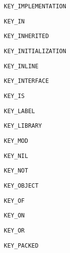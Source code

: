 \documentclass{report}
\begin{document}
\begin{list}{}
\begin{description}
\item[\texttt{KEY{\_}IMPLEMENTATION}] \label{PasDoc_Tokenizer-KEY_IMPLEMENTATION}
\index{}
 
\item[\texttt{KEY{\_}IN}] \label{PasDoc_Tokenizer-KEY_IN}
\index{}
 
\item[\texttt{KEY{\_}INHERITED}] \label{PasDoc_Tokenizer-KEY_INHERITED}
\index{}
 
\item[\texttt{KEY{\_}INITIALIZATION}] \label{PasDoc_Tokenizer-KEY_INITIALIZATION}
\index{}
 
\item[\texttt{KEY{\_}INLINE}] \label{PasDoc_Tokenizer-KEY_INLINE}
\index{}
 
\item[\texttt{KEY{\_}INTERFACE}] \label{PasDoc_Tokenizer-KEY_INTERFACE}
\index{}
 
\item[\texttt{KEY{\_}IS}] \label{PasDoc_Tokenizer-KEY_IS}
\index{}
 
\item[\texttt{KEY{\_}LABEL}] \label{PasDoc_Tokenizer-KEY_LABEL}
\index{}
 
\item[\texttt{KEY{\_}LIBRARY}] \label{PasDoc_Tokenizer-KEY_LIBRARY}
\index{}
 
\item[\texttt{KEY{\_}MOD}] \label{PasDoc_Tokenizer-KEY_MOD}
\index{}
 
\item[\texttt{KEY{\_}NIL}] \label{PasDoc_Tokenizer-KEY_NIL}
\index{}
 
\item[\texttt{KEY{\_}NOT}] \label{PasDoc_Tokenizer-KEY_NOT}
\index{}
 
\item[\texttt{KEY{\_}OBJECT}] \label{PasDoc_Tokenizer-KEY_OBJECT}
\index{}
 
\item[\texttt{KEY{\_}OF}] \label{PasDoc_Tokenizer-KEY_OF}
\index{}
 
\item[\texttt{KEY{\_}ON}] \label{PasDoc_Tokenizer-KEY_ON}
\index{}
 
\item[\texttt{KEY{\_}OR}] \label{PasDoc_Tokenizer-KEY_OR}
\index{}
 
\item[\texttt{KEY{\_}PACKED}] \label{PasDoc_Tokenizer-KEY_PACKED}
\index{}
 

\end{description}
\end{list}
\end{document}
